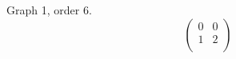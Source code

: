 \documentclass{article}
\begin{document}
Graph 1, order 6.
$$\begin{pmatrix}
0 & 0 \\
1 & 2 \\ 
\end{pmatrix}$$
\end{document}
